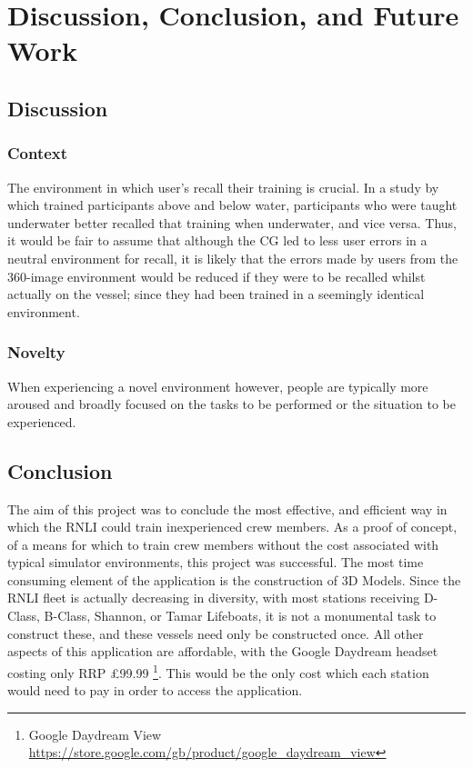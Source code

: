 \documentclass[ %
                    author={Elis Jones},
                supervisor={Dr. Kirsten Cater},
                    degree={BSc},
                     title={The Effect of Presentation Medium on Spatial Cognition},
                  subtitle={in the Virtual Environment},
                      year={2018} ]{dissertation}
\begin{document}
\chapter{Discussion, Conclusion, and Future Work}


\section{Discussion}

\subsection{Context}\label{context}
The environment in which user's recall their training is crucial. In a study by \cite{godden} which trained participants above and below water, participants who were taught underwater better recalled that training when underwater, and vice versa. Thus, it would be fair to assume that although the CG led to less user errors in a neutral environment for recall, it is likely that the errors made by users from the 360-image environment would be reduced if they were to be recalled whilst actually on the vessel; since they had been trained in a seemingly identical environment.

\subsection{Novelty}\label{novelty}
When experiencing a novel environment however, people are typically more aroused and broadly focused on the tasks to be performed or the situation to be experienced. \citep{Witmer1998}


\section{Conclusion}
The aim of this project was to conclude the most effective, and efficient way in which the RNLI could train inexperienced crew members. As a proof of concept, of a means for which to train crew members without the cost associated with typical simulator environments, this project was successful. The most time consuming element of the application is the construction of 3D Models. Since the RNLI fleet is actually decreasing in diversity, with most stations receiving D-Class, B-Class, Shannon, or Tamar Lifeboats, it is not a monumental task to construct these, and these vessels need only be constructed once. All other aspects of this application are affordable, with the Google Daydream headset costing only RRP £99.99 \footnote{Google Daydream View \url{https://store.google.com/gb/product/google_daydream_view}}. This would be the only cost which each station would need to pay in order to access the application.
\end{document}
